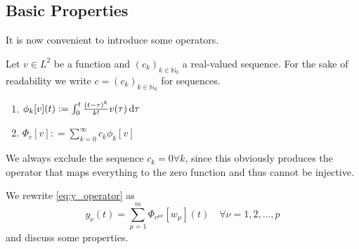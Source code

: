 \subsection{Basic Properties}
It is now convenient to introduce some operators.
\begin{definition}{}{}
	Let $v\in L^2$ be a function and $(c_k)_{k\in\mathbb{N}_0}$ a real-valued sequence. 
	For the sake of readability we write 
	$c=(c_k)_{k\in\mathbb{N}_0}$ for sequences. 
	\begin{enumerate}
	\item $\phi_k[v](t):= \int_0^t \frac{(t-\tau)^k}{k!} v(\tau) \, \text{d} \tau $
	\item $\Phi_c[v] : = \sum_{k=0}^\infty c_k \phi_k[v]$
	\end{enumerate}
	We always exclude the sequence $c_k=0\forall k$, since 
	this obviously produces the operator that maps everything to the zero function and 
	thus cannot be injective.
\end{definition}
We rewrite \eqref{eq:y_operator} as
\begin{equation}
y_\nu(t) = \sum\limits_{\mu=1}^m \Phi_{c^{\mu\nu}}[w_\mu](t) 
\quad \forall \nu =1,2,\ldots , p   \label{eq:y_Phi}
\end{equation}
and discuss some properties.

